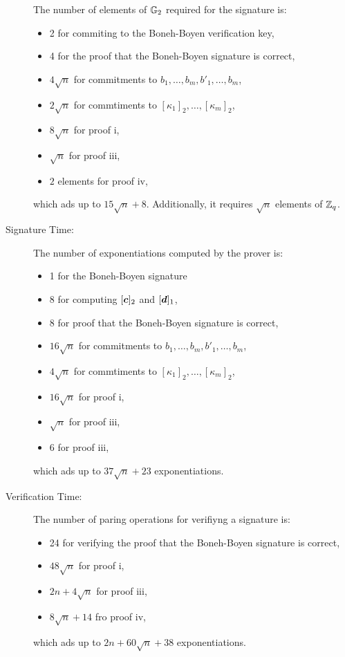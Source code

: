 \begin{description}
The number of elements of $\mathbb{G}_2$ required  for the signature is:
\begin{itemize}
\item 2 for commiting to the Boneh-Boyen verification key,
\item 4 for the proof that the Boneh-Boyen signature is correct,
\item $4\sqrt{n}$ for commitments to $b_1,\ldots,b_m,b'_1,\ldots,b_m$,
\item $2\sqrt{n}$ for commtiments to $[\kappa_1]_2,\ldots,[\kappa_m]_2$,
\item $8\sqrt{n}$ for proof i,
\item $\sqrt{n}$ for proof iii,
\item $2$ elements for proof iv,
\end{itemize}
which ads up to $15\sqrt{n}+8$. Additionally, it requires $\sqrt{n}$ elements of $\mathbb{Z}_q$.
\item[Signature Time:] The number of exponentiations computed by the prover is:
\begin{itemize}
\item 1 for the Boneh-Boyen signature
\item 8 for computing $[{\boldsymbol{c}}]_2$ and $[{\boldsymbol{d}}]_1$,
\item 8 for proof that the Boneh-Boyen signature is correct,
\item $16\sqrt{n}$ for commitments to $b_1,\ldots,b_m,b'_1,\ldots,b_m$,
\item $4\sqrt{n}$ for commtiments to $[\kappa_1]_2,\ldots,[\kappa_m]_2$,
\item $16\sqrt{n}$ for proof i,
\item $\sqrt{n}$ for proof iii,
\item $6$ for proof iii,
\end{itemize}
which ads up to $37\sqrt{n}+23$ exponentiations.
\item[Verification Time:] The number of paring operations for verifiyng a signature is:
\begin{itemize}
\item 24 for verifying the proof that the Boneh-Boyen signature is correct,
\item $48\sqrt{n}$ for proof i,
\item $2n+4\sqrt{n}$ for proof iii,
\item $8\sqrt{n} + 14$ fro proof iv,
\end{itemize}
which ads up to $2n + 60\sqrt{n}+38$ exponentiations.
\end{description}